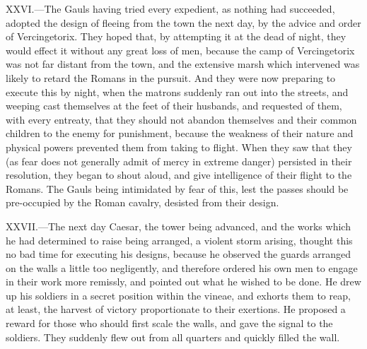 XXVI.—The Gauls having tried every expedient, as nothing had succeeded,
adopted the design of fleeing from the town the next day, by the advice
and order of Vercingetorix. They hoped that, by attempting it at the
dead of night, they would effect it without any great loss of men,
because the camp of Vercingetorix was not far distant from the town, and
the extensive marsh which intervened was likely to retard the Romans in
the pursuit. And they were now preparing to execute this by night, when
the matrons suddenly ran out into the streets, and weeping cast
themselves at the feet of their husbands, and requested of them, with
every entreaty, that they should not abandon themselves and their common
children to the enemy for punishment, because the weakness of their
nature and physical powers prevented them from taking to flight. When
they saw that they (as fear does not generally admit of mercy in extreme
danger) persisted in their resolution, they began to shout aloud, and
give intelligence of their flight to the Romans. The Gauls being
intimidated by fear of this, lest the passes should be pre-occupied by
the Roman cavalry, desisted from their design.

XXVII.—The next day Caesar, the tower being advanced, and the works
which he had determined to raise being arranged, a violent storm
arising, thought this no bad time for executing his designs, because he
observed the guards arranged on the walls a little too negligently, and
therefore ordered his own men to engage in their work more remissly, and
pointed out what he wished to be done. He drew up his soldiers in a
secret position within the vineae, and exhorts them to reap, at least,
the harvest of victory proportionate to their exertions. He proposed a
reward for those who should first scale the walls, and gave the signal
to the soldiers. They suddenly flew out from all quarters and quickly
filled the wall.

